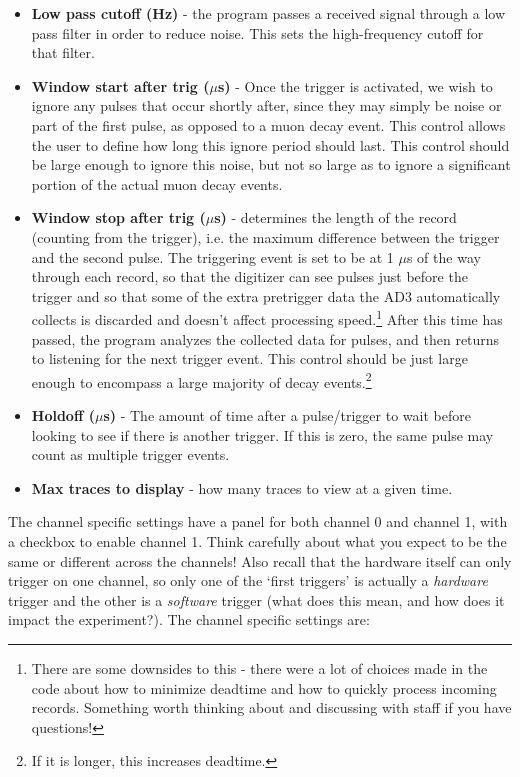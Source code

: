 \documentclass{../lab}
\begin{document}
\begin{itemize}
    \item \textbf{Low pass cutoff (Hz)} - the program passes a received signal through a low pass filter in order to reduce noise. This sets the high-frequency cutoff for that filter.
    \item \textbf{Window start after trig ($\mu$s)} - Once the trigger is activated, we wish to ignore any pulses that occur shortly after, since they may simply be noise or part of the first pulse, as opposed to a muon decay event. This control allows the user to define how long this ignore period should last. This control should be large enough to ignore this noise, but not so large as to ignore a significant portion of the actual muon decay events.
    \item \textbf{Window stop after trig ($\mu$s) }- determines the length of the record (counting from the trigger), i.e. the maximum difference between the trigger and the second pulse. The triggering event is set to be at 1 $\mu$s of the way through each record, so that the digitizer can see pulses just before the trigger and so that some of the extra pretrigger data the AD3 automatically collects is discarded and doesn't affect processing speed.\footnote{There are some downsides to this - there were a lot of choices made in the code about how to minimize deadtime and how to quickly process incoming records. Something worth thinking about and discussing with staff if you have questions!} After this time has passed, the program analyzes the collected data for pulses, and then returns to listening for the next trigger event. This control should be just large enough to encompass a large majority of decay events.\footnote{If it is longer, this increases deadtime.}
    \item \textbf{Holdoff ($\mu$s)} - The amount of time after a pulse/trigger to wait before looking to see if there is another trigger. If this is zero, the same pulse may count as multiple trigger events.
    \item \textbf{Max traces to display} - how many traces to view at a given time.
\end{itemize}

The channel specific settings have a panel for both channel 0 and channel 1, with a checkbox to enable channel 1. Think carefully about what you expect to be the same or different across the channels! Also recall that the hardware itself can only trigger on one channel, so only one of the `first triggers' is actually a \textit{hardware} trigger and the other is a \textit{software} trigger (what does this mean, and how does it impact the experiment?). The channel specific settings are:
\end{document}
